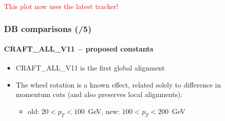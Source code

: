 \documentclass[compress]{beamer}
\begin{document}
\begin{frame}
\tiny \textcolor{red}{This plot now uses the latest tracker!}
\end{frame}

\begin{frame}
\frametitle{DB comparisons (/5)}
\framesubtitle{CRAFT\_ALL\_V11 $-$ proposed constants}

\begin{itemize}\scriptsize
\item CRAFT\_ALL\_V11 is the first global alignment
\item The wheel rotation is a known effect, related solely to difference in momentum cuts (and also preserves local alignments):
\begin{itemize}
\item old: $20 < p_T < 100$~GeV, \hfill new: $100 < p_T < 200$~GeV \hfill \mbox{ }
\end{itemize}
\end{itemize}


\end{frame}
\end{document}
